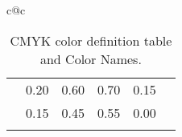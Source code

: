 \begin{table}[!ht]
\begin{center}
\begin{scriptsize}
\begin{tabular}{c@{\quad}c}
\begin{tabular}{|c|c|cccc|}
\clrow{lightbrown}              & 0.20 & 0.60 & 0.70 & 0.15 \\
\clrow{verylightbrown}          & 0.15 & 0.45 & 0.55 & 0.00 \\
      \clspc
      \hline
    \end{tabular}
   \\
  \end{tabular}
\end{scriptsize}
  \caption{\label{tbl:CMYKcolor}
    {\prog} CMYK color definition table and Color Names.
    } %
\end{center}
\end{table}
\vfill
